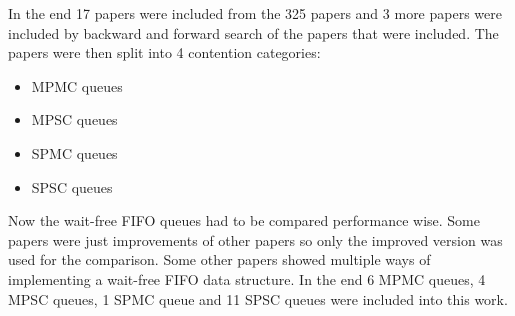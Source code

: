 In the end 17 papers were included from the 325 papers and 3 more papers were included by backward and forward search of the papers that were included. The papers were then split into 4 contention categories:
\begin{itemize}
   \item \ac{MPMC} queues \cite{Kogan2011WaitFreeQueues,FeldmanDechevV2,RamalheteQueue,Verma2013Scalable,FastFetchAndAddWaitFreeQueue,wCQWaitFreeQueue}
   \item \ac{MPSC} queues \cite{WangCacheCoherent,jiffy,JayantiLog,Drescher2015GuardedSections}
   \item \ac{SPMC} queues \cite{Mateíspmc}
   \item \ac{SPSC} queues \cite{Lamport1983SPSCCircularBuffer,torquati2010singleproducersingleconsumerqueuessharedcache,Wang2013BQueue,MaffioneCacheAware,ffq}
\end{itemize}
Now the wait-free \ac{FIFO} queues had to be compared performance wise. Some papers were just improvements of other papers so only the improved version was used for the comparison. Some other papers showed multiple ways of implementing a wait-free \ac{FIFO} data structure. In the end 6 \ac{MPMC} queues, 4 \ac{MPSC} queues, 1 \ac{SPMC} queue and 11 \ac{SPSC} queues were included into this work.